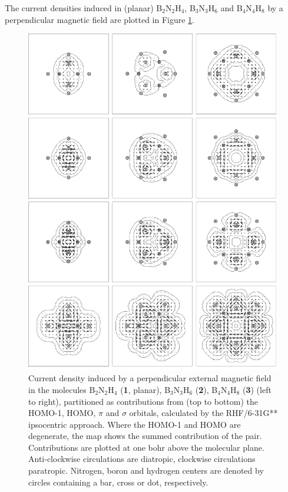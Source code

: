 The current densities induced in (planar) B$_2$N$_2$H$_4$, B$_3$N$_3$H$_6$ and B$_4$N$_4$H$_8$ by a perpendicular magnetic field are plotted in Figure \ref{ch5.fig.f04}.
\begin{figure}[htdp]
\begin{center}
\includegraphics{huckel/figures/fig4.eps}
\end{center}
\caption{Current density induced by a perpendicular external magnetic field in the molecules B$_2$N$_2$H$_4$ (\textbf{1}, planar), B$_3$N$_3$H$_6$ (\textbf{2}), B$_4$N$_4$H$_8$ (\textbf{3}) (left to
right), partitioned as contributions from (top to bottom) the \mbox{HOMO-1}, HOMO, $\pi$ and $\sigma$ orbitals, calculated by the RHF/6-31G** ipsocentric approach. Where the \mbox{HOMO-1} and HOMO are degenerate, the map shows the summed contribution of the pair. Contributions are plotted at one bohr above the molecular plane. Anti-clockwise circulations are
diatropic, clockwise circulations paratropic. Nitrogen, boron and hydrogen centers are denoted by circles containing a bar, cross or dot, respectively.}
\label{ch5.fig.f04}
\end{figure}
